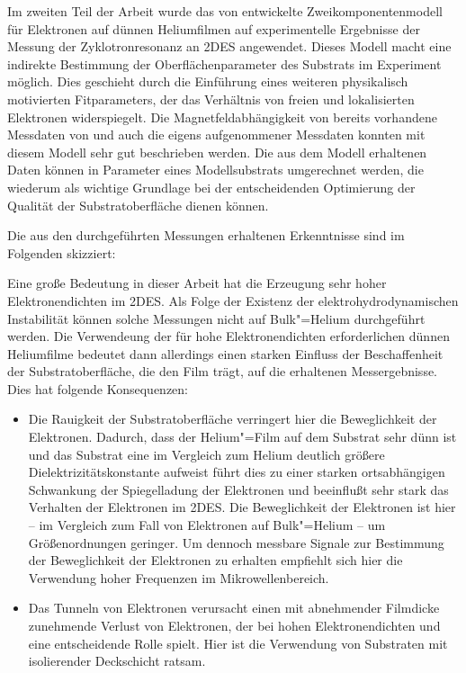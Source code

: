 Im zweiten Teil der Arbeit wurde das von  entwickelte Zweikomponentenmodell für Elektronen auf dünnen Heliumfilmen auf experimentelle Ergebnisse der Messung der Zyklotronresonanz an 2DES angewendet. Dieses Modell macht eine indirekte Bestimmung der Oberflächenparameter des Substrats im Experiment möglich. Dies geschieht durch die Einführung eines weiteren physikalisch motivierten Fitparameters, der das Verhältnis von freien und lokalisierten Elektronen widerspiegelt. Die Magnetfeldabhängigkeit von bereits vorhandene Messdaten von  und auch die eigens aufgenommener Messdaten konnten mit diesem Modell sehr gut beschrieben werden. Die aus dem Modell erhaltenen Daten können in Parameter eines Modellsubstrats umgerechnet werden, die wiederum als wichtige Grundlage bei der entscheidenden Optimierung der Qualität der Substratoberfläche dienen können.
 
Die aus den durchgeführten Messungen erhaltenen Erkenntnisse sind im Folgenden skizziert:

Eine große Bedeutung in dieser Arbeit hat die Erzeugung sehr hoher Elektronendichten im 2DES. Als Folge der Existenz der elektrohydrodynamischen Instabilität können solche Messungen nicht auf Bulk"=Helium durchgeführt werden. Die Verwendeung der für hohe Elektronendichten erforderlichen dünnen Heliumfilme bedeutet dann allerdings einen starken Einfluss der Beschaffenheit der Substratoberfläche, die den Film trägt, auf die erhaltenen Messergebnisse.
Dies hat folgende Konsequenzen:
\begin{itemize}
	\item Die Rauigkeit der Substratoberfläche verringert hier die Beweglichkeit der Elektronen. Dadurch, dass der Helium"=Film auf dem Substrat sehr dünn ist und das Substrat eine im Vergleich zum Helium deutlich größere Dielektrizitätskonstante aufweist führt dies zu einer starken ortsabhängigen Schwankung der Spiegelladung der Elektronen und beeinflußt sehr stark das Verhalten der Elektronen im 2DES.
Die Beweglichkeit der Elektronen ist hier -- im Vergleich zum Fall von Elektronen auf Bulk"=Helium -- um Größenordnungen geringer. Um dennoch messbare Signale zur Bestimmung der Beweglichkeit der Elektronen zu erhalten empfiehlt sich hier die Verwendung hoher Frequenzen im Mikrowellenbereich.
	\item Das Tunneln von Elektronen verursacht einen mit abnehmender Filmdicke zunehmende Verlust von Elektronen, der bei hohen Elektronendichten und eine entscheidende Rolle spielt. Hier ist die Verwendung von Substraten mit isolierender Deckschicht ratsam.
\end{itemize}

